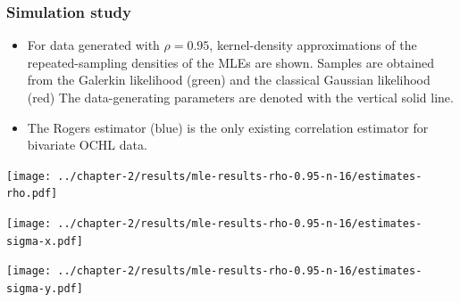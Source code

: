 \documentclass{beamer}
\begin{document}
\begin{frame}
  \frametitle{Simulation study}
    
  
\begin{itemize}
\item For data generated with $\rho=0.95$, kernel-density approximations
  of the repeated-sampling densities of the MLEs are shown.  Samples
  are obtained from the Galerkin likelihood (green) and the classical
  Gaussian likelihood (red) The data-generating parameters are denoted
  with the vertical solid line.

\item The Rogers estimator (blue) is the only existing correlation estimator for
  bivariate OCHL data.
  \end{itemize}
\end{frame}
\begin{frame}
  \centering
  \texttt{[image: ../chapter-2/results/mle-results-rho-0.95-n-16/estimates-rho.pdf]}
\end{frame}
\begin{frame}
  \centering
  \texttt{[image: ../chapter-2/results/mle-results-rho-0.95-n-16/estimates-sigma-x.pdf]}
\end{frame}
\begin{frame}
  \centering
  \texttt{[image: ../chapter-2/results/mle-results-rho-0.95-n-16/estimates-sigma-y.pdf]}
\end{frame}
\end{document}
